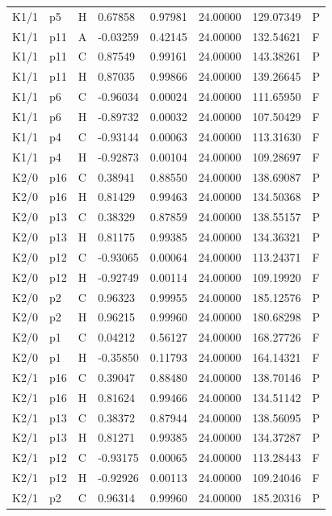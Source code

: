 \begin{longtable}{llllllll}
K1/1 & p5 & H & 0.67858 & 0.97981 & 24.00000 & 129.07349 & P \\
K1/1 & p11 & A & -0.03259 & 0.42145 & 24.00000 & 132.54621 & F \\
K1/1 & p11 & C & 0.87549 & 0.99161 & 24.00000 & 143.38261 & P \\
K1/1 & p11 & H & 0.87035 & 0.99866 & 24.00000 & 139.26645 & P \\
K1/1 & p6 & C & -0.96034 & 0.00024 & 24.00000 & 111.65950 & F \\
K1/1 & p6 & H & -0.89732 & 0.00032 & 24.00000 & 107.50429 & F \\
K1/1 & p4 & C & -0.93144 & 0.00063 & 24.00000 & 113.31630 & F \\
K1/1 & p4 & H & -0.92873 & 0.00104 & 24.00000 & 109.28697 & F \\
K2/0 & p16 & C & 0.38941 & 0.88550 & 24.00000 & 138.69087 & P \\
K2/0 & p16 & H & 0.81429 & 0.99463 & 24.00000 & 134.50368 & P \\
K2/0 & p13 & C & 0.38329 & 0.87859 & 24.00000 & 138.55157 & P \\
K2/0 & p13 & H & 0.81175 & 0.99385 & 24.00000 & 134.36321 & P \\
K2/0 & p12 & C & -0.93065 & 0.00064 & 24.00000 & 113.24371 & F \\
K2/0 & p12 & H & -0.92749 & 0.00114 & 24.00000 & 109.19920 & F \\
K2/0 & p2 & C & 0.96323 & 0.99955 & 24.00000 & 185.12576 & P \\
K2/0 & p2 & H & 0.96215 & 0.99960 & 24.00000 & 180.68298 & P \\
K2/0 & p1 & C & 0.04212 & 0.56127 & 24.00000 & 168.27726 & F \\
K2/0 & p1 & H & -0.35850 & 0.11793 & 24.00000 & 164.14321 & F \\
K2/1 & p16 & C & 0.39047 & 0.88480 & 24.00000 & 138.70146 & P \\
K2/1 & p16 & H & 0.81624 & 0.99466 & 24.00000 & 134.51142 & P \\
K2/1 & p13 & C & 0.38372 & 0.87944 & 24.00000 & 138.56095 & P \\
K2/1 & p13 & H & 0.81271 & 0.99385 & 24.00000 & 134.37287 & P \\
K2/1 & p12 & C & -0.93175 & 0.00065 & 24.00000 & 113.28443 & F \\
K2/1 & p12 & H & -0.92926 & 0.00113 & 24.00000 & 109.24046 & F \\
K2/1 & p2 & C & 0.96314 & 0.99960 & 24.00000 & 185.20316 & P \\

\end{longtable}
